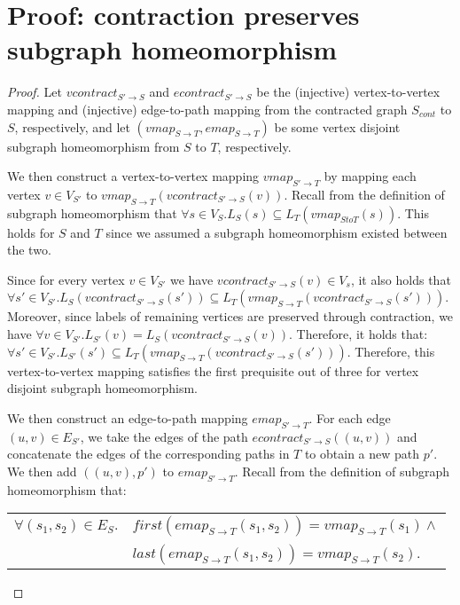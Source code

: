 \section{Proof: contraction preserves subgraph homeomorphism}
\label{proof:contractionHomeo}
\begin{proof}

Let $\mathit{vcontract}_{S' \to S}$ and $\mathit{econtract}_{S' \to S}$ be the (injective) vertex-to-vertex mapping and (injective) edge-to-path mapping from the contracted graph $S_{cont}$ to $S$, respectively, and let $(\mathit{vmap}_{S \to T}, \mathit{emap}_{S \to T})$ be some vertex disjoint subgraph homeomorphism from $S$ to $T$, respectively.

We then construct a vertex-to-vertex mapping $\mathit{vmap}_{S' \to T}$ by mapping each vertex $v \in V_{S'}$ to $\mathit{vmap}_{S \to T}(\mathit{vcontract}_{S' \to S}(v))$. Recall from the definition of subgraph homeomorphism that $\forall s \in V_S . L_S(s) \subseteq L_T(\mathit{vmap}_{S to T}(s))$. This holds for $S$ and $T$ since we assumed a subgraph homeomorphism existed between the two.

Since for every vertex $v \in V_{S'}$ we have $\mathit{vcontract}_{S' \to S}(v) \in V_s$, it also holds that $\forall s' \in V_{S'} . L_S(\mathit{vcontract}_{S' \to S}(s')) \subseteq L_T(\mathit{vmap}_{S \to T}(\mathit{vcontract}_{S' \to S}(s')))$. Moreover, since labels of remaining vertices are preserved through contraction, we have $\forall v \in V_{S'}.L_{S'}(v)=L_S(\mathit{vcontract}_{S' \to S}(v))$. Therefore, it holds that: $\forall s' \in V_{S'} . L_{S'}(s') \subseteq L_T(\mathit{vmap}_{S \to T}(\mathit{vcontract}_{S' \to S}(s')))$. Therefore, this vertex-to-vertex mapping satisfies the first prequisite out of three for vertex disjoint subgraph homeomorphism.

We then construct an edge-to-path mapping $\mathit{emap}_{S' \to T}$. For each edge $(u, v) \in E_{S'}$, we take the edges of the path $\mathit{econtract}_{S' \to S}((u, v))$ and concatenate the edges of the corresponding paths in $T$ to obtain a new path $p'$. We then add $((u, v), p')$ to $\mathit{emap}_{S' \to T}$. Recall from the definition of subgraph homeomorphism that:

\begin{tabular}{ll}
$\forall(s_1, s_2)\in E_S .$&$ \mathit{first}(\mathit{emap}_{S \to T}(s_1, s_2))=\mathit{vmap}_{S \to T}(s_1)\land$\\
&$\mathit{last}(\mathit{emap}_{S \to T}(s_1, s_2))=\mathit{vmap}_{S \to T}(s_2)$.
\end{tabular}


\end{proof}
